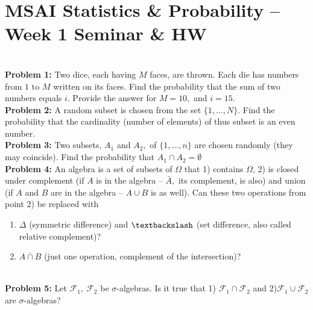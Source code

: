 \documentclass[12pt]{article}
\numberwithin{equation}{section}
\begin{document}
\section*{MSAI Statistics \& Probability – Week 1 Seminar \& HW}\\

\textbf{Problem 1:} Two dice, each having $M$ faces, are thrown. Each die has numbers from $1$ to $M$ written on its faces. Find the probability that the sum of two numbers equals $i$. Provide the answer for $M=10,$ and $i=15.$
\\

\textbf{Problem 2:} A random subset is chosen from the set $\{1,\dots,N\}.$ Find the probability that the cardinality (number of elements) of thus subset is an even number.
\\

\textbf{Problem 3:} Two subsets, $A_1$ and $A_2,$ of $\{1,\dots,n\}$ are chosen randomly (they may coincide). Find the probability that $A_1 \cap A_2 = \emptyset$
\\

\textbf{Problem 4:} 
An algebra is a set of subsets of $\Omega$ that 1) contains $\Omega$, 2) is closed under complement (if $A$ is in the algebra – $\bar{A},$ its complement, is also) and union (if $A$ and $B$ are in the algebra – $A\cup B$ is as well). Can these two operations from point 2) be replaced with
\begin{enumerate}
    \item $\Delta$ (symmetric difference) and $\textbackslash$ (set difference, also called relative complement)?
    \item $\overline{A\cap B}$ (just one operation, complement of the intersection)?
\end{enumerate}
\\

\textbf{Problem 5:} Let $\mathcal{F}_1,~\mathcal{F}_2$ be $\sigma$-algebras. Is it true that 1) $\mathcal{F}_1\cap\mathcal{F}_2$ and 2)$\mathcal{F}_1\cup\mathcal{F}_2$ are $\sigma$-algebras?
\end{document}
